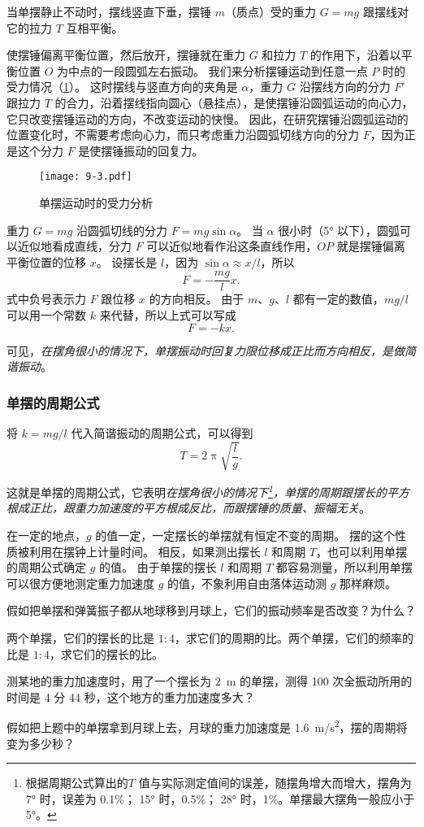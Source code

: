 当单摆静止不动时，摆线竖直下垂，摆锤 $m$（质点）受的重力 $G=mg$ 跟摆线对它的拉力 $T$ 互相平衡。

使摆锤偏离平衡位置，然后放开，摆锤就在重力 $G$ 和拉力 $T$ 的作用下，沿着以平衡位置 $O$ 为中点的一段圆弧左右振动。
我们来分析摆锤运动到任意一点 $P$ 时的受力情况（\cref{fig:9-3}）。
这时摆线与竖直方向的夹角是 $\alpha$，重力 $G$ 沿摆线方向的分力 $F'$ 跟拉力 $T$ 的合力，沿着摆线指向圆心（悬挂点），是使摆锤沿圆弧运动的向心力，它只改变摆锤运动的方向，不改变运动的快慢。
因此，在研究摆锤沿圆弧运动的位置变化时，不需要考虑向心力，而只考虑重力沿圆弧切线方向的分力 $F$，因为正是这个分力 $F$ 是使摆锤振动的回复力。
\begin{figure}
  \texttt{[image: 9-3.pdf]}
  \caption{单摆运动时的受力分析}\label{fig:9-3}
\end{figure}
    
重力 $G=mg$ 沿圆弧切线的分力 $F=mg\sin\alpha$。
当 $\alpha$ 很小时（\ang{5} 以下），圆弧可以近似地看成直线，分力 $F$ 可以近似地看作沿这条直线作用，$OP$ 就是摆锤偏离平衡位置的位移 $x$。
设摆长是 $l$，因为 $\sin\alpha\approx x/l$，所以
\[F=-\frac{mg}{l}x.\]
式中负号表示力 $F$ 跟位移 $x$ 的方向相反。
由于 $m$、$g$、$l$ 都有一定的数值，$mg/l$ 可以用一个常数 $k$ 来代替，所以上式可以写成
\[F=-kx.\]

可见，\emph{在摆角很小的情况下，单摆振动时回复力限位移成正比而方向相反，是做简谐振动}。

\subsubsection{单摆的周期公式}
将 $k=mg/l$ 代入简谐振动的周期公式，可以得到
\[T=2\uppi\sqrt{\frac{l}{g}}.\]

这就是单摆的周期公式，它表明\emph{在摆角很小的情况下\footnote{根据周期公式算出的$T$ 值与实际测定值间的误差，随摆角增大而增大，摆角为 \ang{7} 时，误差为 0.1\%； \ang{15} 时，0.5\%； \ang{28} 时，1\%。单摆最大摆角一般应小于 \ang{5}。}，单摆的周期跟摆长的平方根成正比，跟重力加速度的平方根成反比，而跟摆锤的质量、振幅无关}。

在一定的地点，$g$ 的值一定，一定摆长的单摆就有恒定不变的周期。
摆的这个性质被利用在摆钟上计量时间。
相反，如果测出摆长 $l$ 和周期 $T$，也可以利用单摆的周期公式确定 $g$ 的值。
由于单摆的摆长 $l$ 和周期 $T$ 都容易测量，所以利用单摆可以很方便地测定重力加速度 $g$ 的值，不象利用自由落体运动测 $g$ 那样麻烦。

\begin{Practice}
\begin{question}
  \item 假如把单摆和弹簧振子都从地球移到月球上，它们的振动频率是否改变？为什么？
  \item 两个单摆，它们的摆长的比是 $1:4$，求它们的周期的比。两个单摆，它们的频率的比是 $1:4$，求它们的摆长的比。
  \item 测某地的重力加速度时，用了一个摆长为 \qty{2}{m} 的单摆，测得 100 次全振动所用的时间是 4 分 44 秒，这个地方的重力加速度多大？
  \item 假如把上题中的单摆拿到月球上去，月球的重力加速度是 \qty{1.6}{m/s^2}，摆的周期将变为多少秒？
\end{question}
\end{Practice}

